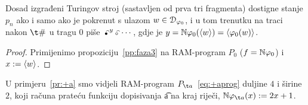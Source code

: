 \begin{korolar}[{name=[prve tri faze transpiliranog stroja]}]\label{kor:faza3}
	Dosad izgrađeni Turingov stroj (sastavljen od prva tri fragmenta) dostigne stanje $p_n$ ako i samo ako je pokrenut s ulazom $w\in\mathcal D_{\varphi_0}$, i u tom trenutku na traci nakon $\t\#$ u tragu $0$ piše $\raisebox{-1pt}{\t\textbullet}^y\raisebox{-1pt}{\t\textopenbullet}\dotsm$, gdje je $y={\mathbb N}\varphi_0(\langle w\rangle)=\langle\varphi_0(w)\rangle$.
\end{korolar}
\begin{proof}
    Primijenimo propoziciju~\ref{pp:faza3} na RAM-program $P_0$ ($f={\mathbb N}\varphi_0$) i $x:=\langle w\rangle$. %
\end{proof}

\begin{primjer}[{name=[treći fragment transpiliranog stroja]}]\label{pr:+a2}
U primjeru~\ref{pr:+a} smo vidjeli RAM-program $P_{\t a}$~\eqref{eq:+aprog} duljine $4$ i širine $2$, koji računa prateću funkciju dopisivanja \t a na kraj riječi, $\N\varphi_{\t a}(x):=2x+1$.


\end{primjer}
